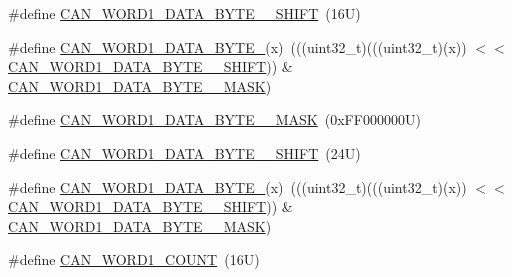 \begin{DoxyCompactItemize}
\item 
\#define \mbox{\hyperlink{group___c_a_n___register___masks_ga74e324a0ea45adbeeafd694ddebc4e02}{C\+A\+N\+\_\+\+W\+O\+R\+D1\+\_\+\+D\+A\+T\+A\+\_\+\+B\+Y\+T\+E\+\_\+\_\+\+S\+H\+I\+FT}}~(16\+U)
\item 
\#define \mbox{\hyperlink{group___c_a_n___register___masks_ga822c2d94189ac5f7ea8239206c12bbbc}{C\+A\+N\+\_\+\+W\+O\+R\+D1\+\_\+\+D\+A\+T\+A\+\_\+\+B\+Y\+T\+E\+\_}}(x)~(((uint32\+\_\+t)(((uint32\+\_\+t)(x)) $<$$<$ \mbox{\hyperlink{group___c_a_n___register___masks_ga74e324a0ea45adbeeafd694ddebc4e02}{C\+A\+N\+\_\+\+W\+O\+R\+D1\+\_\+\+D\+A\+T\+A\+\_\+\+B\+Y\+T\+E\+\_\+\_\+\+S\+H\+I\+FT}})) \& \mbox{\hyperlink{group___c_a_n___register___masks_ga9762ba9b3f8288f68e3db1e0d2deccaf}{C\+A\+N\+\_\+\+W\+O\+R\+D1\+\_\+\+D\+A\+T\+A\+\_\+\+B\+Y\+T\+E\+\_\+\_\+\+M\+A\+SK}})
\item 
\#define \mbox{\hyperlink{group___c_a_n___register___masks_ga9330617952319833e6c0ccf8d115144b}{C\+A\+N\+\_\+\+W\+O\+R\+D1\+\_\+\+D\+A\+T\+A\+\_\+\+B\+Y\+T\+E\+\_\+\_\+\+M\+A\+SK}}~(0x\+F\+F000000\+U)
\item 
\#define \mbox{\hyperlink{group___c_a_n___register___masks_gaa7615281b358dfed5fb817b9c1fb157e}{C\+A\+N\+\_\+\+W\+O\+R\+D1\+\_\+\+D\+A\+T\+A\+\_\+\+B\+Y\+T\+E\+\_\+\_\+\+S\+H\+I\+FT}}~(24\+U)
\item 
\#define \mbox{\hyperlink{group___c_a_n___register___masks_gab574a88bc531c0af5744f5de04e8db2a}{C\+A\+N\+\_\+\+W\+O\+R\+D1\+\_\+\+D\+A\+T\+A\+\_\+\+B\+Y\+T\+E\+\_}}(x)~(((uint32\+\_\+t)(((uint32\+\_\+t)(x)) $<$$<$ \mbox{\hyperlink{group___c_a_n___register___masks_gaa7615281b358dfed5fb817b9c1fb157e}{C\+A\+N\+\_\+\+W\+O\+R\+D1\+\_\+\+D\+A\+T\+A\+\_\+\+B\+Y\+T\+E\+\_\+\_\+\+S\+H\+I\+FT}})) \& \mbox{\hyperlink{group___c_a_n___register___masks_ga9330617952319833e6c0ccf8d115144b}{C\+A\+N\+\_\+\+W\+O\+R\+D1\+\_\+\+D\+A\+T\+A\+\_\+\+B\+Y\+T\+E\+\_\+\_\+\+M\+A\+SK}})
\item 
\#define \mbox{\hyperlink{group___c_a_n___register___masks_ga47bbb2075b9ece29bf7a8f053e769323}{C\+A\+N\+\_\+\+W\+O\+R\+D1\+\_\+\+C\+O\+U\+NT}}~(16\+U)
\end{DoxyCompactItemize}
